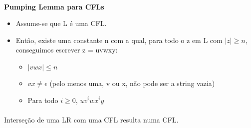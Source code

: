\documentclass[../resumosTCOM.tex]{subfiles}
\begin{document}
\paragraph{}

\textbf{Pumping Lemma para CFLs}
\begin{itemize}
    \item Assume-se que L é uma CFL.
    \item Então, existe uma constante n com a qual, para todo o z em L com \(|z| \geq n\), conseguimos escrever z = uvwxy:
    \begin{itemize}
        \item \(|vwx| \leq n\)
        \item \(vx \neq \epsilon\) (pelo menos uma, v ou x, não pode ser a string vazia)
        \item Para todo \(i \geq 0\), \(uv^iwx^iy\)
    \end{itemize}
\end{itemize}

\paragraph{}

Interseção de uma LR com uma CFL resulta numa CFL.
\end{document}
